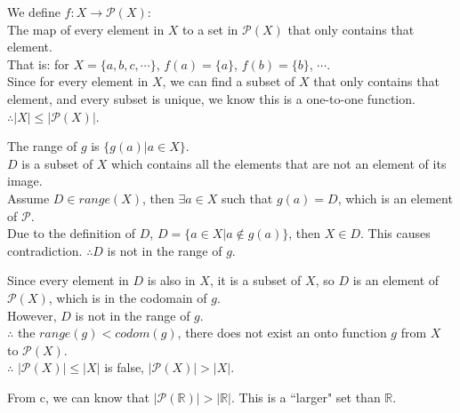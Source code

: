 \documentclass[12pt]{exam}
\begin{document}
\begin{solution}
    \begin{qparts}
        \item
        We define $f: X \rightarrow \mathcal{P}(X)$: \\
        The map of every element in $X$ to a set in $\mathcal{P}(X)$ that 
        only contains that element.\\
        That is: for $X = \{a,b,c,\cdots\}$, $f(a) = \{a\}$, $f(b) = \{b\}$, $\cdots$.\\
        Since for every element in $X$, we can find a subset of $X$ that only contains that element, 
        and every subset is unique, we know this is a one-to-one function.\\
        $\therefore |X| \leq |\mathcal{P}(X)|$.
        \item
        The range of $g$ is $\{ g(a) | a \in X\}$. \\
        $D$ is a subset of $X$ which contains all the elements that are not an element of its image.\\
        Assume $D \in range(X)$, then $\exists a \in X$ such that $g(a) = D$, which is an element of $\mathcal{P}$.\\
        Due to the definition of $D$, $D = \{ a \in X | a \not \in g(a)\}$, then $X \in D$. This causes contradiction.
        $\therefore D$ is not in the range of $g$.
        \item
        Since every element in $D$ is also in $X$, it is a subset of $X$, so $D$ is an element of $\mathcal{P}(X)$, which is 
        in the codomain of $g$.\\
        However, $D$ is not in the range of $g$.\\
        $\therefore$ the $range(g) < codom(g)$, there does not exist an onto function $g$ from $X$ to $\mathcal{P}(X)$.\\
        $\therefore$ $|\mathcal{P}(X)| \leq |X|$ is false, $|\mathcal{P}(X)| > |X|$.
        \item
        From c, we can know that $| \mathcal{P}(\mathbb{R}) | > |\mathbb{R}|$. This is a ``larger" set than $\mathbb{R}$.

    \end{qparts}
\end{solution}
\end{document}
